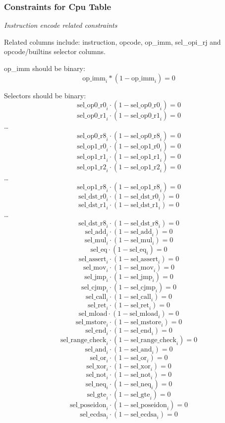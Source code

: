 \subsubsection{Constraints for Cpu Table} \label{sec:cpu-constraints}

\emph{Instruction encode related constraints}

Related columns include: instruction, opcode, op\_imm, sel\_opi\_rj and opcode/builtins selector columns.

op\_imm should be binary:
\[ \mathrm{op\_imm}_i * (1 - \mathrm{op\_imm}_i) = 0 \]

Selectors should be binary:
\[ \mathrm{sel\_op0\_r0}_i \cdot (1-\mathrm{sel\_op0\_r0}_i) = 0 \]
\[ \mathrm{sel\_op0\_r1}_i \cdot (1-\mathrm{sel\_op0\_r1}_i) = 0 \]
\dots
\[ \mathrm{sel\_op0\_r8}_i \cdot (1-\mathrm{sel\_op0\_r8}_i) = 0 \]
\[ \mathrm{sel\_op1\_r0}_i \cdot (1-\mathrm{sel\_op1\_r0}_i) = 0 \]
\[ \mathrm{sel\_op1\_r1}_i \cdot (1-\mathrm{sel\_op1\_r1}_i) = 0 \]
\[ \mathrm{sel\_op1\_r2}_i \cdot (1-\mathrm{sel\_op1\_r2}_i) = 0 \]
\dots
\[ \mathrm{sel\_op1\_r8}_i \cdot (1-\mathrm{sel\_op1\_r8}_i) = 0 \]
\[ \mathrm{sel\_dst\_r0}_i \cdot (1-\mathrm{sel\_dst\_r0}_i) = 0 \]
\[ \mathrm{sel\_dst\_r1}_i \cdot (1-\mathrm{sel\_dst\_r1}_i) = 0 \]
\dots
\[ \mathrm{sel\_dst\_r8}_i \cdot (1-\mathrm{sel\_dst\_r8}_i) = 0 \]
\[ \mathrm{sel\_add}_i \cdot (1-\mathrm{sel\_add}_i) = 0 \]
\[ \mathrm{sel\_mul}_i \cdot (1-\mathrm{sel\_mul}_i) = 0 \]
\[ \mathrm{sel\_eq} \cdot (1-\mathrm{sel\_eq}_i) = 0 \]
\[ \mathrm{sel\_assert}_i \cdot (1-\mathrm{sel\_assert}_i) = 0 \]
\[ \mathrm{sel\_mov}_i \cdot (1 - \mathrm{sel\_mov}_i) = 0 \]
\[ \mathrm{sel\_jmp}_i \cdot (1 - \mathrm{sel\_jmp}_i) = 0 \]
\[ \mathrm{sel\_cjmp}_i \cdot (1 - \mathrm{sel\_cjmp}_i) = 0 \]
\[ \mathrm{sel\_call}_i \cdot (1 - \mathrm{sel\_call}_i) = 0 \]
\[ \mathrm{sel\_ret}_i \cdot (1 - \mathrm{sel\_ret}_i) = 0 \]
\[ \mathrm{sel\_mload} \cdot (1 - \mathrm{sel\_mload}_i) = 0 \]
\[ \mathrm{sel\_mstore}_i \cdot (1 - \mathrm{sel\_mstore}_i) = 0 \]
\[ \mathrm{sel\_end}_i  \cdot (1 - \mathrm{sel\_end}_i) = 0 \]
\[ \mathrm{sel\_range\_check}_i \cdot (1 - \mathrm{sel\_range\_check}_i) = 0 \]
\[ \mathrm{sel\_and}_i \cdot (1 - \mathrm{sel\_and}_i) = 0 \]
\[ \mathrm{sel\_or}_i \cdot (1 - \mathrm{sel\_or}_i) = 0 \]
\[ \mathrm{sel\_xor}_i \cdot (1 - \mathrm{sel\_xor}_i) = 0 \]
\[ \mathrm{sel\_not}_i \cdot (1 - \mathrm{sel\_not}_i) = 0 \]
\[ \mathrm{sel\_neq}_i \cdot (1 - \mathrm{sel\_neq}_i) = 0 \]
\[ \mathrm{sel\_gte}_i \cdot (1 - \mathrm{sel\_gte}_i) = 0 \]
\[ \mathrm{sel\_poseidon}_i \cdot (1 - \mathrm{sel\_poseidon}_i) = 0 \]
\[ \mathrm{sel\_ecdsa}_i \cdot (1 - \mathrm{sel\_ecdsa}_i) = 0 \]


